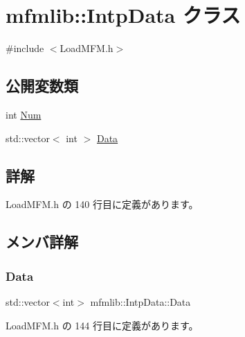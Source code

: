 \hypertarget{classmfmlib_1_1_intp_data}{}\section{mfmlib\+:\+:Intp\+Data クラス}
\label{classmfmlib_1_1_intp_data}


{\ttfamily \#include $<$Load\+M\+F\+M.\+h$>$}

\subsection*{公開変数類}
\begin{DoxyCompactItemize}
\item 
int \mbox{\hyperlink{classmfmlib_1_1_intp_data_a37095e24cb32a0effa481f42b378c048}{Num}}
\item 
std\+::vector$<$ int $>$ \mbox{\hyperlink{classmfmlib_1_1_intp_data_a14d5af9ed9c62c44dfcd7cb35afbe11e}{Data}}
\end{DoxyCompactItemize}


\subsection{詳解}


 Load\+M\+F\+M.\+h の 140 行目に定義があります。



\subsection{メンバ詳解}
\mbox{\label{classmfmlib_1_1_intp_data_a14d5af9ed9c62c44dfcd7cb35afbe11e}} 
\subsubsection{\texorpdfstring{Data}{Data}}
{\footnotesize\ttfamily std\+::vector$<$int$>$ mfmlib\+::\+Intp\+Data\+::\+Data}



 Load\+M\+F\+M.\+h の 144 行目に定義があります。

\mbox{\label{classmfmlib_1_1_intp_data_a37095e24cb32a0effa481f42b378c048}} 
